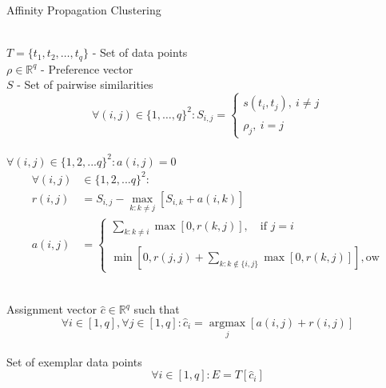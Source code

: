 \documentclass[conference]{IEEEtran}
\begin{document}
\begin{algorithm}
   \caption{Affinity Propagation Clustering}
   \label{alg4}
\begin{algorithmic}[1]
   		\\$T = \{t_1, t_2, \ldots, t_q\}$ - Set of data points
        \\$\rho \in \mathbb{R}^q$  - Preference vector
        \\$S$ - Set of pairwise similarities 
        $$\forall (i, j) \in \{1, \ldots, q\}^2  : S_{i,j} = \begin{cases}s(t_i, t_j),\ i \neq j\\\\
        					\rho_j,\ i = j
        		\end{cases}$$    
    	\\$\forall (i, j) \in \{1, 2, ... q\}^2 : a(i, j) = 0$
    \begin{align*}
    \forall(i, j) &\in \{1, 2, ... q\}^2 :\\
    r(i, j) &= S_{i,j} - \max_{k : k \neq j}[S_{i,k} + a(i, k)]\\
    a(i, j) &= \begin{cases}
               							\sum_{k : k \neq i} \max[0, r(k, j)],\quad \mbox{if }j = i\\\\
               							\min[0, r(j, j) + \sum_{k : k \notin \{i, j\}} \max[0, r(k, j)]], \mathrm{ow}
            							\end{cases}
    \end{align*}
    	 
        
    	\\Assignment vector $\hat{c} \in \mathbb{R}^q$ such that 
        \\$$\forall i \in [1,q], \forall j \in [1,q] : \hat{c}_i = \operatorname*{argmax}_j [a(i, j) + r(i, j)]$$
        \\Set of exemplar data points
        \\$$\forall i \in [1, q] : E = {T[\hat{c}_i]}$$
    
\end{algorithmic}
\end{algorithm}

\end{document}
